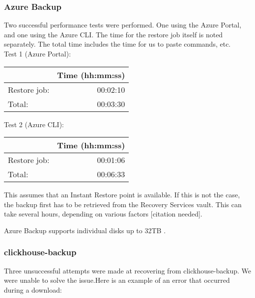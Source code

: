 \subsubsection{Azure Backup}


Two successful performance tests were performed.
One using the Azure Portal, and one using the Azure CLI.
The time for the restore job itself is noted separately.
The total time includes the time for us to paste commands, etc.\\

Test 1 (Azure Portal):
\begin{center}
\begin{tabular}{lr}
\hline
 & Time (hh:mm:ss)\\
\hline
Restore job: & 00:02:10\\
Total: & 00:03:30\\
\hline
\end{tabular}
\end{center}

Test 2 (Azure CLI):
\begin{center}
\begin{tabular}{lr}
\hline
 & Time (hh:mm:ss)\\
\hline
Restore job: & 00:01:06\\
Total: & 00:06:33\\
\hline
\end{tabular}
\end{center}

This assumes that an Instant Restore point is available. If this is not the case, the backup first has to be retrieved from the Recovery Services vault. This can take several hours, depending on various factors [citation needed].

Azure Backup supports individual disks up to 32TB \cite{v-amallick_azure_nodate}.

\subsubsection{clickhouse-backup}
Three unsuccessful attempts were made at recovering from clickhouse-backup. We were unable to solve the issue.Here is an example of an error that occurred during a download:

